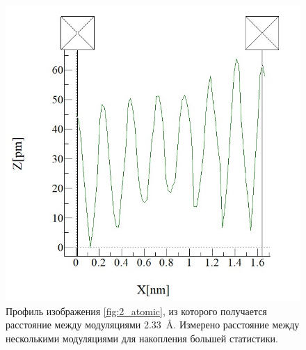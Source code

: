 \documentclass[a4paper, 12pt]{article}
\begin{document}
	\begin{figure}[H]
		\centering
		\includegraphics[width=0.5\linewidth]{../STM_data/STM_profiles/Graphs/Crystal_structure}
		\caption{Профиль изображения \ref{fig:2_atomic}, из которого получается расстояние между модуляциями 2.33~\AA. Измерено расстояние между несколькими модуляциями для накопления большей статистики.}
		\label{fig:2_atomic_g}
	\end{figure}
	
\end{document}
